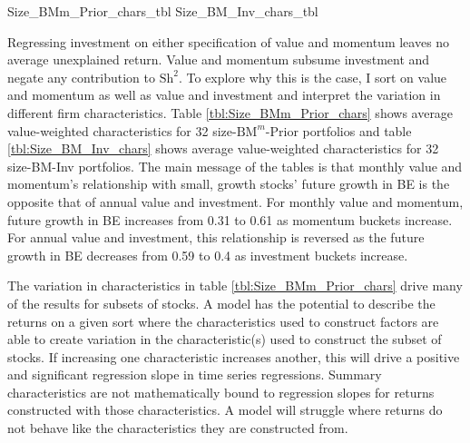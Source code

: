 
{Size_BMm_Prior_chars_tbl}
{Size_BM_Inv_chars_tbl}

Regressing investment on either specification of value and momentum
leaves no average unexplained return.
Value and momentum subsume investment and negate any contribution to
$\text{Sh}^2$.
To explore why this is the case, I sort on value and momentum as well as
value and investment and interpret the variation in different firm
characteristics.
Table \ref{tbl:Size_BMm_Prior_chars} shows average value-weighted
characteristics for 32 size-$\text{BM}^m$-Prior portfolios and table
\ref{tbl:Size_BM_Inv_chars} shows average value-weighted characteristics for 32
size-BM-Inv portfolios. The main message of the tables is that monthly value
and momentum's relationship with small, growth stocks' future growth in BE is
the opposite that of annual value and investment. For monthly value and
momentum, future growth in BE increases from 0.31 to 0.61 as momentum buckets
increase. For annual value and investment, this relationship is reversed as the
future growth in BE decreases from 0.59 to 0.4 as investment buckets increase.

The variation in characteristics in table \ref{tbl:Size_BMm_Prior_chars} drive
many of the results for subsets of stocks.
A model has the potential to describe the
returns on a given sort where the characteristics used to construct factors are
able to create variation in the characteristic(s) used to construct the subset
of stocks. If increasing one characteristic increases another, this will drive
a positive and significant regression slope in time series regressions.
Summary characteristics are not mathematically bound to
regression slopes for returns constructed with those characteristics.
A model will struggle where returns do not behave like the characteristics they
are constructed from.

